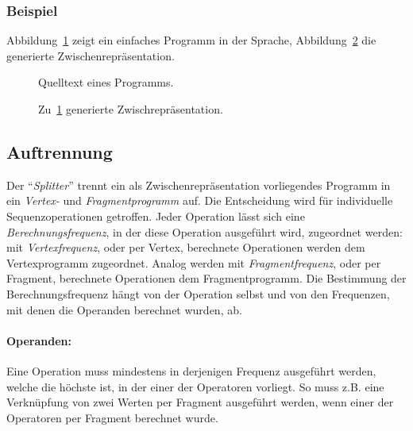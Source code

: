 \documentclass[twoside,a4paper,fleqn,12pt]{article}
\begin{document}

\subsubsection{Beispiel}

Abbildung~\ref{fig:ir_sample_src} zeigt ein einfaches Programm in der Sprache, Abbildung~\ref{fig:ir_sample_gen} die generierte Zwischenrepräsentation.

\begin{figure}[h]
   \centering
  
  \caption{Quelltext eines Programms.}
  \label{fig:ir_sample_src}
\end{figure}
\begin{figure}[h]
   \centering
  
  \caption{Zu~\ref{fig:ir_sample_src} generierte Zwischrepräsentation.}
  \label{fig:ir_sample_gen}
\end{figure}

\subsection{Auftrennung}

Der "`\emph{Splitter}"' trennt ein als Zwischenrepräsentation vorliegendes Programm in ein \emph{Vertex-} und \emph{Fragmentprogramm} auf.
Die Entscheidung wird für individuelle Sequenzoperationen getroffen. Jeder Operation lässt sich eine \emph{Berechnungsfrequenz}, %
in der diese Operation ausgeführt wird, zugeordnet werden: mit \emph{Vertexfrequenz}, oder per Vertex, berechnete Operationen werden dem Vertexprogramm zugeordnet.
Analog werden mit \emph{Fragmentfrequenz}, oder per Fragment, berechnete Operationen dem Fragmentprogramm. Die Bestimmung der Berechnungsfrequenz hängt von der Operation selbst
und von den Frequenzen, mit denen die Operanden berechnet wurden, ab. 

\paragraph{Operanden:} Eine Operation muss mindestens in derjenigen Frequenz ausgeführt werden, welche die höchste ist, in der einer der Operatoren
vorliegt. So muss z.B. eine Verknüpfung von zwei Werten per Fragment ausgeführt werden, wenn einer der Operatoren per Fragment berechnet wurde.
\end{document}
